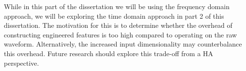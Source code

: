 \documentclass[logo,bsc,singlespacing,parskip,online]{infthesis}
\begin{document}
While in this part of the dissertation we will be using the frequency domain approach,
we will be exploring the time domain approach in part 2 of this dissertation. 
The motivation for this is to determine whether the overhead of constructing engineered features is too high compared to operating on the raw waveform. 
Alternatively, the increased input dimensionality may counterbalance this overhead. Future research should explore this trade-off from a HA perspective.



\end{document}
